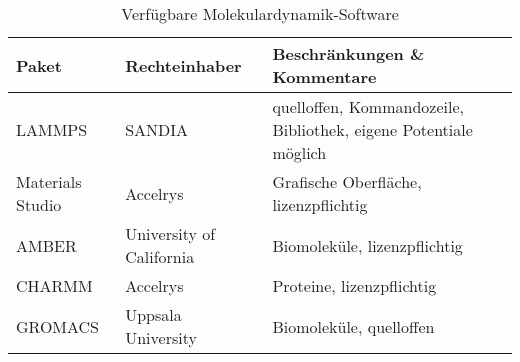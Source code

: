 \begin{table}
  \oddrowcolors
  \caption[Verfügbare Molekulardynamik-Software]{
    Verfügbare Molekulardynamik-Software
  }
  \label{tab:mdsoftware}
  \begin{tabularx}{\textwidth}{|llX|}
    \hline
    \textbf{Paket}                                                               & \textbf{Rechteinhaber}   & \textbf{Beschränkungen \& Kommentare}                            \\
    \hline
    LAMMPS\cite{plimpton_lammps_2014,plimpton_fast_1995}                         & SANDIA                   & quelloffen, Kommandozeile, Bibliothek, eigene Potentiale möglich \\
    Materials Studio\cite{accelrys_materials_2014}                               & Accelrys                 & Grafische Oberfläche, lizenzpflichtig                            \\
    AMBER\cite{case_amber_2014,case_amber_2005}                                  & University of California & Biomoleküle, lizenzpflichtig                                     \\
    CHARMM\cite{brooks_charmm_2014,brooks_charmm:_1983,brooks_charmm:_2009}      & Accelrys                 & Proteine, lizenzpflichtig                                        \\
    GROMACS\cite{lindahl_gromacs_2014,berendsen_gromacs:_1995,hess_gromacs_2008} & Uppsala University       & Biomoleküle, quelloffen                                          \\
    \hline
  \end{tabularx}
\end{table}

